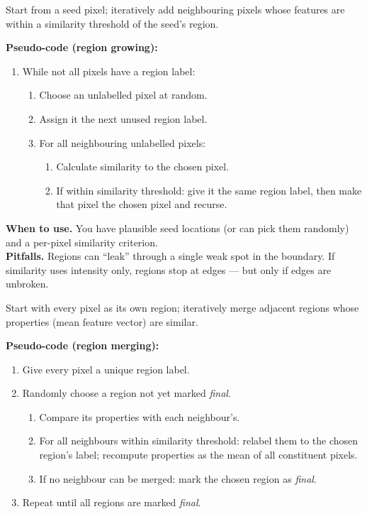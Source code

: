 \separator

\begin{defbox}
Start from a seed pixel; iteratively add neighbouring pixels whose features are within a similarity threshold of the seed's region.
\end{defbox}

\textbf{Pseudo-code (region growing):}
\begin{enumerate}
  \item While not all pixels have a region label:
  \begin{enumerate}
    \item Choose an unlabelled pixel at random.
    \item Assign it the next unused region label.
    \item For all neighbouring unlabelled pixels:
    \begin{enumerate}
      \item Calculate similarity to the chosen pixel.
      \item If within similarity threshold: give it the same region label, then make that pixel the chosen pixel and recurse.
    \end{enumerate}
  \end{enumerate}
\end{enumerate}

\textbf{When to use.} You have plausible seed locations (or can pick them randomly) and a per-pixel similarity criterion.\\
\textbf{Pitfalls.} Regions can ``leak'' through a single weak spot in the boundary. If similarity uses intensity only, regions stop at edges --- but only if edges are unbroken.

\separator

\begin{defbox}
Start with every pixel as its own region; iteratively merge adjacent regions whose properties (mean feature vector) are similar.
\end{defbox}

\textbf{Pseudo-code (region merging):}
\begin{enumerate}
  \item Give every pixel a unique region label.
  \item Randomly choose a region not yet marked \emph{final}.
  \begin{enumerate}
    \item Compare its properties with each neighbour's.
    \item For all neighbours within similarity threshold: relabel them to the chosen region's label; recompute properties as the mean of all constituent pixels.
    \item If no neighbour can be merged: mark the chosen region as \emph{final}.
  \end{enumerate}
  \item Repeat until all regions are marked \emph{final}.
\end{enumerate}

